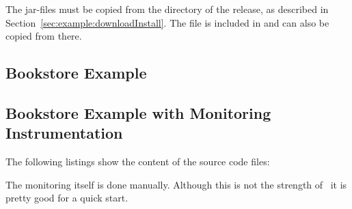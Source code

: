 \vspace{1ex}
\vspace{1ex}

The \Kieker{} jar-files must be copied from the  directory %
of the \Kieker{} release, as described in Section~\ref{sec:example:downloadInstall}. %
The file  is included in  %
and can also be copied from there.


\subsection{Bookstore Example}

\subsection{Bookstore Example with Monitoring Instrumentation}

The following listings show the content of the source code files:
\setJavaCodeListing       






		The monitoring itself is done manually. Although this is not the strength of \Kieker\ it is pretty good for a quick start. 

